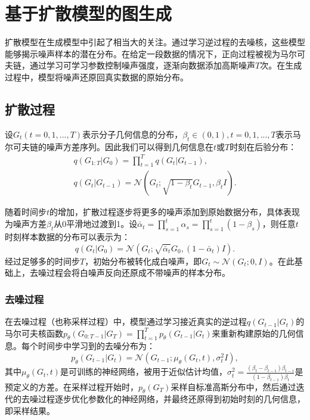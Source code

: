 \section{基于扩散模型的图生成}
扩散模型在生成模型中引起了相当大的关注。通过学习逆过程的去噪核，这些模型能够揭示噪声样本的潜在分布。在给定一段数据的情况下，正向过程被视为马尔可夫链，通过学习可学习参数控制噪声强度，逐渐向数据添加高斯噪声$T$次。在生成过程中，模型将噪声还原回真实数据的原始分布。

\subsection{扩散过程}
设$G_t (t=0, 1, ..., T)$表示分子几何信息的分布，$\beta_t \in (0, 1), t=0, 1, ..., T$表示马尔可夫链的噪声方差序列。因此我们可以得到几何信息在$t$或$T$时刻在后验分布：
\begin{eqnarray}
&q(G_{1:T} | G_0) = \prod^T_{t=1} q(G_t | G_{t-1}), & \\
&q(G_t | G_{t-1}) = \mathcal{N}(G_t; \sqrt{1-\beta_t}G_{t-1}, \beta_t I).&
\end{eqnarray}

随着时间步$t$的增加，扩散过程逐步将更多的噪声添加到原始数据分布，具体表现为噪声方差$\beta_t$从0平滑地过渡到1。设$\bar{\alpha}_t = \prod^t_{s=1} \alpha_s = \prod^t_{s=1}(1-\beta_s)$，则任意$t$时刻样本数据的分布可以表示为：
\begin{equation}
    q(G_t|G_0) = \mathcal{N}(G_t; \sqrt{\bar{\alpha}_t} G_0, (1 - \bar{\alpha}_t) I).
\end{equation} 
经过足够多的时间步$T$，初始分布被转化成白噪声，即$G_t \sim \mathcal{N}(G_t; 0, I)$。在此基础上，去噪过程会将白噪声反向还原成不带噪声的样本分布。

\subsubsection{去噪过程}
在去噪过程（也称采样过程）中，模型通过学习接近真实的逆过程$q(G_{t-1} | G_t)$的马尔可夫核函数$p_\theta(G_{0:T-1}| G_{T}) = \prod^T_{t=1} p_\theta(G_{t-1} | G_t)$来重新构建原始的几何信息。每个时间步中学习到的去噪分布为： 
\begin{equation}
  p_\theta(G_{t-1} | G_t) = \mathcal{N}(G_{t-1}; \mu_\theta(G_t, t), \sigma_t^2 I),
\end{equation}
其中$\mu_\theta(G_t, t)$是可训练的神经网络，被用于近似估计均值，$\sigma^2_t = \frac{(\beta_t - \beta_{t-1})\beta_{t-1}}{(1 - \beta_{t-1}) \beta_t}$是预定义的方差。在采样过程开始时，$p_\theta(G_T)$采样自标准高斯分布中，然后通过迭代的去噪过程逐步优化参数化的神经网络，并最终还原得到初始时刻的几何信息，即采样结果。

